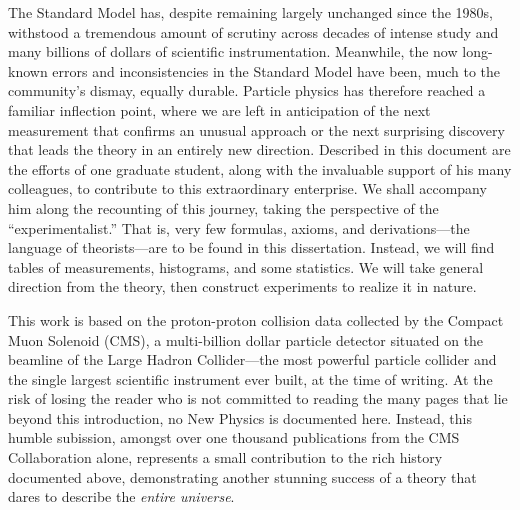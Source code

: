 \begin{dissertationintroduction}
The Standard Model has, despite remaining largely unchanged since the 1980s, withstood a tremendous amount of scrutiny across decades of intense study and many billions of dollars of scientific instrumentation. %
Meanwhile, the now long-known errors and inconsistencies in the Standard Model have been, much to the community's dismay, equally durable. %
Particle physics has therefore reached a familiar inflection point, where we are left in anticipation of the next measurement that confirms an unusual approach or the next surprising discovery that leads the theory in an entirely new direction. 
Described in this document are the efforts of one graduate student, along with the invaluable support of his many colleagues, to contribute to this extraordinary enterprise. 
We shall accompany him along the recounting of this journey, taking the perspective of the ``experimentalist.'' 
That is, very few formulas, axioms, and derivations---the language of theorists---are to be found in this dissertation. 
Instead, we will find tables of measurements, histograms, and some statistics. 
We will take general direction from the theory, then construct experiments to realize it in nature. 

This work is based on the proton-proton collision data collected by the Compact Muon Solenoid (CMS), a multi-billion dollar particle detector situated on the beamline of the Large Hadron Collider---the most powerful particle collider and the single largest scientific instrument ever built, at the time of writing. 
At the risk of losing the reader who is not committed to reading the many pages that lie beyond this introduction, no New Physics is documented here.
Instead, this humble subission, amongst over one thousand publications from the CMS Collaboration alone, represents a small contribution to the rich history documented above, demonstrating another stunning success of a theory that dares to describe the \textit{entire universe}.
\end{dissertationintroduction}
